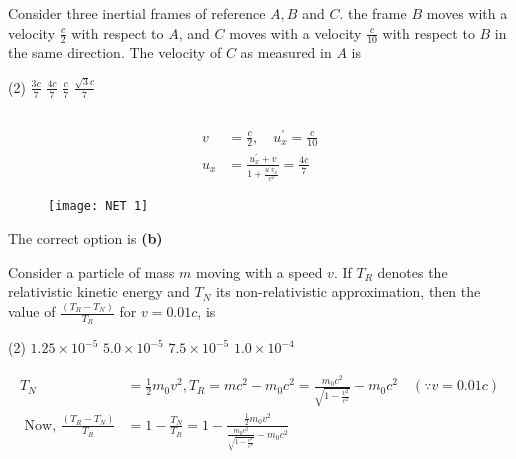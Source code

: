 \begin{enumerate}
\begin{minipage}{\textwidth}
	\item Consider three inertial frames of reference $A, B$ and $C$. the frame $B$ moves with a velocity $\frac{c}{2}$ with respect to $A$, and $C$ moves with a velocity $\frac{c}{10}$ with respect to $B$ in the same direction. The velocity of $C$ as measured in $A$ is
\end{minipage}
\begin{tasks}(2)
	\task[\textbf{A.}] $\frac{3 c}{7}$
	\task[\textbf{B.}]$\frac{4 c}{7}$
	\task[\textbf{C.}]$\frac{c}{7}$
	\task[\textbf{D.}] $\frac{\sqrt{3} c}{7}$
\end{tasks}
\begin{answer}$\left. \right. $	\\
\begin{minipage}{0.5\textwidth}
		\begin{align*}
	v&=\frac{c}{2}, \quad u_{x}^{\prime}=\frac{c}{10}\\
	u_{x}&=\frac{u_{x}^{\prime}+v}{1+\frac{u^{\prime} v_{x}}{c^{2}}}=\frac{4 c}{7}
	\end{align*}
\end{minipage}
	\begin{minipage}{0.5\textwidth}
	\begin{figure}[H]
		\centering
		\texttt{[image: NET 1]}
	\end{figure}
	\end{minipage}
The correct option is \textbf{(b)}
\end{answer}
\begin{minipage}{\textwidth}
	\item Consider a particle of mass $m$ moving with a speed $v$. If $T_{R}$ denotes the relativistic kinetic energy and $T_{N}$ its non-relativistic approximation, then the value of $\frac{\left(T_{R}-T_{N}\right)}{T_{R}}$ for $v=0.01 c$, is
\end{minipage}
\begin{tasks}(2)
	\task[\textbf{A.}] $1.25 \times 10^{-5}$
	\task[\textbf{B.}]$5.0 \times 10^{-5}$
	\task[\textbf{C.}]$7.5 \times 10^{-5}$
	\task[\textbf{D.}]$1.0 \times 10^{-4}$
\end{tasks}
\begin{answer}
	\begin{align*}
	T_{N}&=\frac{1}{2} m_{0} v^{2}, T_{R}=m c^{2}-m_{0} c^{2}=\frac{m_{0} c^{2}}{\sqrt{1-\frac{v^{2}}{c^{2}}}}-m_{0} c^{2} \quad(\because v=0.01 c)\\
	\text { Now, } \frac{\left(T_{R}-T_{N}\right)}{T_{R}}&=1-\frac{T_{N}}{T_{R}}=1-\frac{\frac{1}{2} m_{0} v^{2}}{\frac{m_{0} c^{2}}{\sqrt{1-\frac{v^{2}}{c^{2}}}}-m_{0} c^{2}}\\

\end{align*}
\end{answer}
\end{enumerate}
